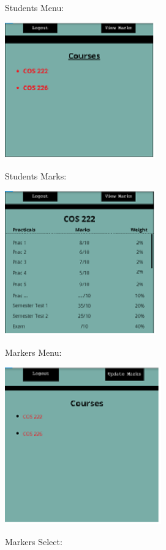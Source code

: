 \documentclass{article}
\begin{document}
\noindent 

Students Menu:

\includegraphics*[width=2.56in, height=2.31in, keepaspectratio=false]{image5}



Students Marks: 

\includegraphics*[width=2.57in, height=2.45in, keepaspectratio=false]{image6}



Markers Menu:

\includegraphics*[width=2.66in, height=2.66in, keepaspectratio=false]{image7}

\noindent 

Markers Select: 
\end{document}
